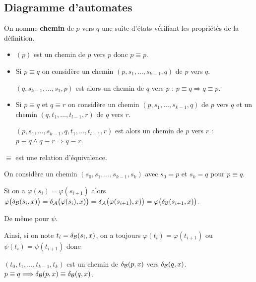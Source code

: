 \subsection{Diagramme d'automates}
\begin{Exercise}
On nomme {\bf chemin} de $p$ vers $q$ une suite d'états vérifiant les propriétés de la définition.

\begin{itemize}
  \item $(p)$ est un chemin de $p$ vers $p$ donc $p\equiv p$.
  \item Si $p\equiv q$ on considère un chemin $(p, s_1, \ldots, s_{k-1}, q)$ de $p$ vers $q$.
  
  $(q, s_{k-1}, \ldots, s_1, p)$ est alors un chemin de $q$ vers $p$ : $p\equiv q \Longrightarrow q\equiv p$.
  \item Si $p \equiv q$ et $q\equiv r$ on considère un chemin $(p, s_1, \ldots, s_{k-1}, q)$ de $p$ vers $q$ et un chemin $(q, t_1, \ldots, t_{l-1}, r)$ de $q$ vers $r$. 
  
  $(p, s_1, \ldots, s_{k-1}, q, t_1, \ldots, t_{l-1}, r)$ est alors un chemin de $p$ vers $r$ : $p\equiv q \wedge q \equiv r \Longrightarrow q\equiv r$.
\end{itemize}
$\equiv$ est une relation d'équivalence.
\end{Exercise}
\begin{Exercise}[label=ques:stable]
On considère un chemin $(s_0, s_1, \ldots, s_{k-1}, s_k)$ avec $s_0=p$ et $s_k=q$ pour $p\equiv q$.

Si on a $\varphi(s_i) = \varphi(s_{i+1})$ alors $\varphi\bigl(\delta_{\cal B}(s_i, x)\bigr) = \delta_{\cal A}\bigl(\varphi(s_i), x)\bigr)
= \delta_{\cal A}\bigl(\varphi(s_{i+1}), x)\bigr) = \varphi\bigl(\delta_{\cal B}(s_{i+1}, x)\bigr)$.

De même pour $\psi$.

Ainsi, si on note $t_i = \delta_{\cal B}(s_i, x)$, on a toujours $\varphi(t_i) = \varphi(t_{i+1})$ ou  $\psi(t_i) = \psi(t_{i+1})$ donc

$(t_0, t_1, \ldots, t_{k-1}, t_k)$ est un chemin de $\delta_{\cal B}(p, x)$ vers $\delta_{\cal B}(q, x)$.
$p\equiv q \Longrightarrow \delta_{\cal B}(p, x)\equiv \delta_{\cal B}(q, x)$.
\end{Exercise}

